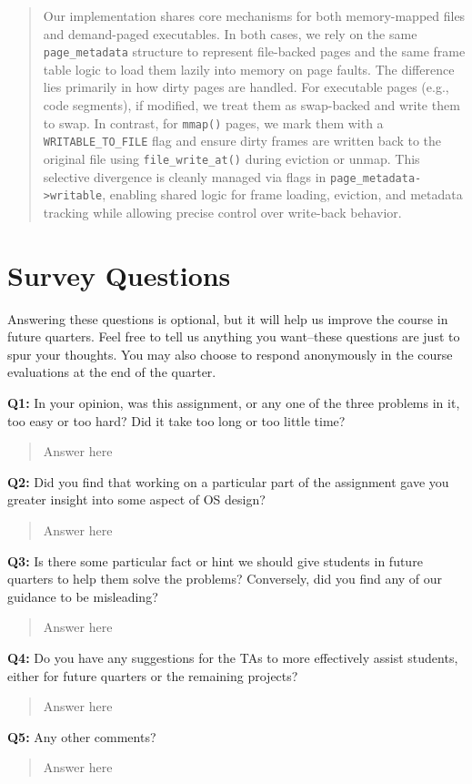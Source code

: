 \documentclass[a4paper,11pt]{paper}
\begin{document}
\begin{quote}
Our implementation shares core mechanisms for both memory-mapped files and demand-paged executables. In both cases, we rely on the same \texttt{page\_metadata} structure to represent file-backed pages and the same frame table logic to load them lazily into memory on page faults. The difference lies primarily in how dirty pages are handled. For executable pages (e.g., code segments), if modified, we treat them as swap-backed and write them to swap. In contrast, for \texttt{mmap()} pages, we mark them with a \texttt{WRITABLE\_TO\_FILE} flag and ensure dirty frames are written back to the original file using \texttt{file\_write\_at()} during eviction or unmap. This selective divergence is cleanly managed via flags in \texttt{page\_metadata->writable}, enabling shared logic for frame loading, eviction, and metadata tracking while allowing precise control over write-back behavior.
\end{quote}




\section{Survey Questions}

Answering these questions is optional, but it will help us improve the course in future quarters.  Feel free to tell us anything you want--these questions are just to spur your thoughts.  You may also choose to respond anonymously in the course evaluations at the end of the quarter.

\textbf{Q1:} In your opinion, was this assignment, or any one of the three problems in it, too easy or too hard?  Did it take too long or too little time?
\begin{quote}
  Answer here
\end{quote}

\textbf{Q2:} Did you find that working on a particular part of the assignment gave you greater insight into some aspect of OS design?
\begin{quote}
  Answer here
\end{quote}

\textbf{Q3:} Is there some particular fact or hint we should give students in future quarters to help them solve the problems?  Conversely, did you find any of our guidance to be misleading?
\begin{quote}
  Answer here
\end{quote}

\textbf{Q4:} Do you have any suggestions for the TAs to more effectively assist students, either for future quarters or the remaining projects?
\begin{quote}
  Answer here
\end{quote}

\textbf{Q5:} Any other comments?
\begin{quote}
  Answer here
\end{quote}
\end{document}
